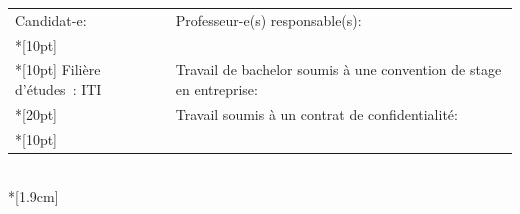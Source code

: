 \begin{spacing}{0.956}
\begin{center}
{
	\begin{tabular*}{16cm}{p{7.59cm} p{7.58cm}}
		\small Candidat-e:					&	\small Professeur-e(s) responsable(s):\\*[10pt]
		\small\textbf{\textsc{\Author}}		&	\small\textbf{\textsc{\Professor}}\\*[10pt]
		\footnotesize  Filière d’études : ITI %
		\footnotesize  {} & \footnotesize  Travail de bachelor soumis à une convention de stage en entreprise: \Convention\\*[20pt]
		\footnotesize  {} & \footnotesize  Travail soumis à un contrat de confidentialité: \Confidentiel\\*[10pt]
	\end{tabular*}\\*[1.9cm]
}


\end{center}
\end{spacing}

